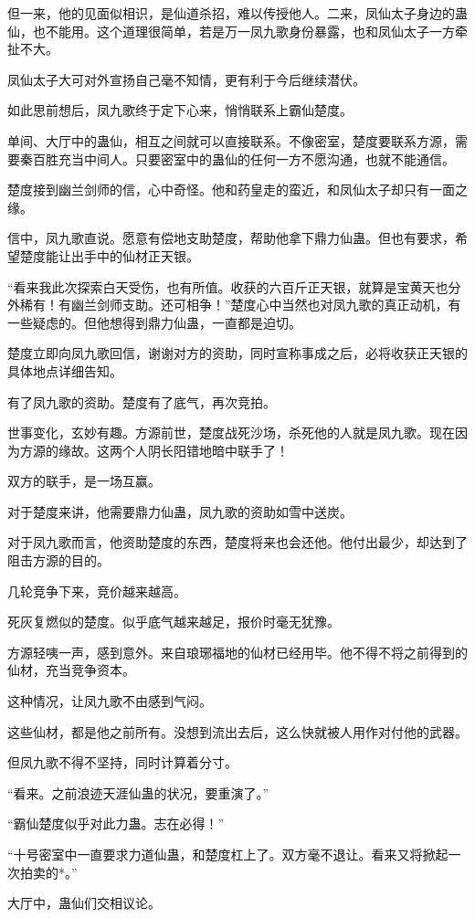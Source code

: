 \begin{this_body}
但一来，他的见面似相识，是仙道杀招，难以传授他人。二来，凤仙太子身边的蛊仙，也不能用。这个道理很简单，若是万一凤九歌身份暴露，也和凤仙太子一方牵扯不大。

凤仙太子大可对外宣扬自己毫不知情，更有利于今后继续潜伏。

如此思前想后，凤九歌终于定下心来，悄悄联系上霸仙楚度。

单间、大厅中的蛊仙，相互之间就可以直接联系。不像密室，楚度要联系方源，需要秦百胜充当中间人。只要密室中的蛊仙的任何一方不愿沟通，也就不能通信。

楚度接到幽兰剑师的信，心中奇怪。他和药皇走的蛮近，和凤仙太子却只有一面之缘。

信中，凤九歌直说。愿意有偿地支助楚度，帮助他拿下鼎力仙蛊。但也有要求，希望楚度能让出手中的仙材正天银。

“看来我此次探索白天受伤，也有所值。收获的六百斤正天银，就算是宝黄天也分外稀有！有幽兰剑师支助。还可相争！”楚度心中当然也对凤九歌的真正动机，有一些疑虑的。但他想得到鼎力仙蛊，一直都是迫切。

楚度立即向凤九歌回信，谢谢对方的资助，同时宣称事成之后，必将收获正天银的具体地点详细告知。

有了凤九歌的资助。楚度有了底气，再次竞拍。

世事变化，玄妙有趣。方源前世，楚度战死沙场，杀死他的人就是凤九歌。现在因为方源的缘故。这两个人阴长阳错地暗中联手了！

双方的联手，是一场互赢。

对于楚度来讲，他需要鼎力仙蛊，凤九歌的资助如雪中送炭。

对于凤九歌而言，他资助楚度的东西，楚度将来也会还他。他付出最少，却达到了阻击方源的目的。

几轮竞争下来，竞价越来越高。

死灰复燃似的楚度。似乎底气越来越足，报价时毫无犹豫。

方源轻咦一声，感到意外。来自琅琊福地的仙材已经用毕。他不得不将之前得到的仙材，充当竞争资本。

这种情况，让凤九歌不由感到气闷。

这些仙材，都是他之前所有。没想到流出去后，这么快就被人用作对付他的武器。

但凤九歌不得不坚持，同时计算着分寸。

“看来。之前浪迹天涯仙蛊的状况，要重演了。”

“霸仙楚度似乎对此力蛊。志在必得！”

“十号密室中一直要求力道仙蛊，和楚度杠上了。双方毫不退让。看来又将掀起一次拍卖的*。”

大厅中，蛊仙们交相议论。


\end{this_body}
